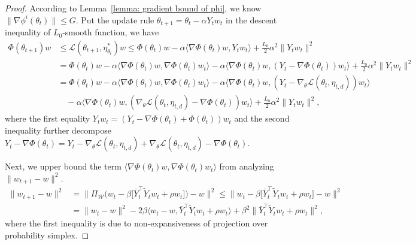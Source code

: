 \documentclass[twoside]{article} %
\theoremstyle{plain}
\theoremstyle{definition}
\theoremstyle{remark}
\newcommand{\Y}{Y}
\newcommand{\Yt}{\tilde{Y}}
\newcommand{\Yb}{\bar{Y}}
\newcommand{\fL}{\mathcal{L}}
\begin{document}
\begin{proof}
According to Lemma~\ref{lemma: gradient bound of phi}, we know $\|\nabla \phi^i(\theta_t)\|\leq G$. Put the update rule $\theta_{t+1} = \theta_t - \alpha Y_t{w}_t$ in the descent inequality of $L_0$-smooth function, we have
\begin{align}
    \Phi(\theta_{t+1})w&\leq \fL({\theta}_{t+1}, {\eta}_{\theta_t}^*){w} \leq \Phi(\theta_t){w} -\alpha\langle\nabla \Phi({\theta}_t){w},\Y_{t}{w}_t\rangle  +\frac{L_0}{2} \alpha^2 \|\Y_t{w}_t \|^2\nonumber\\
    &= \Phi(\theta_t){w} -\alpha\langle \nabla \Phi(\theta_t)w,\nabla \Phi(\theta_t) {w}_t\rangle -\alpha \langle \nabla \Phi(\theta_t)w,(\Y_{t}-\nabla\Phi(\theta_t))w_t \rangle  +\frac{L_0}{2} \alpha^2 \|\Y_{t}{w}_t \|^2 \nonumber\\
    &=\Phi(\theta_t){w} - \alpha\langle \nabla \Phi(\theta_t)w,\nabla \Phi(\theta_t) {w}_t\rangle - \alpha{\langle \nabla \Phi(\theta_t)w, (Y_t - \nabla_{\theta} \fL(\theta_t, \eta_{t,d}))w_t\rangle} \nonumber\\
    &\quad -\alpha{\langle \nabla \Phi(\theta_t)w, (\nabla_{\theta} \fL(\theta_t, \eta_{t,d})-\nabla \Phi(\theta_t))w_t\rangle }+\frac{L_0}{2}\alpha^2 \|Y_tw_t \|^2,
    \label{eq: intermediate descent lemma alg1}
\end{align}
where the first equality  $\Y_tw_t = (\Y_t-\nabla \Phi(\theta_t)+\Phi(\theta_t))w_t$ and the second inequality further decompose $Y_t - \nabla \Phi(\theta_t)= Y_t-\nabla_{\theta} \fL(\theta_t, \eta_{t,d})+\nabla_{\theta}\fL(\theta_t, \eta_{t,d})-\nabla \Phi(\theta_t)$.


Next, we upper bound the term $\langle \nabla \Phi({\theta}_t)w, \nabla \Phi({\theta}_t){w}_t \rangle$ from analyzing $\|w_{t+1}-w \|^2$.
\begin{align}
    \|{w}_{t+1} - {w} \|^2
    &= \| \Pi_{\mathcal{W}} \big({w}_t - \beta \big[\Yb_t^{\top}\Yt_t{w}_t+\rho {w}_t \big]\big) - {w} \|^2\leq \|{w}_t - \beta \big[\Yb_t^{\top}\Yt_t{w}_t+\rho {w}_t \big]- {w} \|^2 \nonumber\\
    &= \|{w}_t - {w} \|^2 -2\beta \langle {w}_t-{w}, \Yb_t^{\top}\Yt_t{w}_t+\rho {w}_t \rangle + \beta^2\|\Yb_t^{\top}\Yt_t{w}_t+\rho {w}_t\|^2,
\end{align}
where the first inequality is due to non-expansiveness of projection over probability simplex.


\end{proof}
\end{document}
